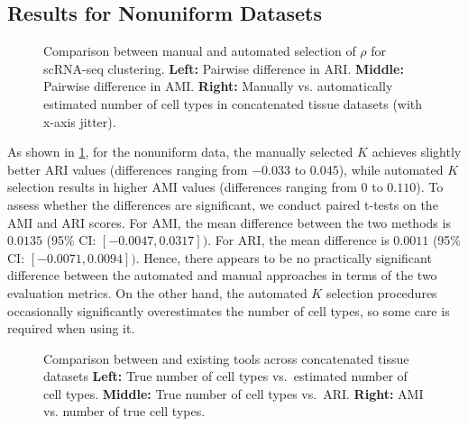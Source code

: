 \subsection{Results for Nonuniform Datasets}
\label{sec:non-unif-data}
\begin{figure}[tp]
	\centering



	\caption{Comparison between manual and automated selection of $\rho$ for scRNA-seq clustering. 
        \textbf{Left:} Pairwise difference in ARI. 
		\textbf{Middle:} Pairwise difference in AMI.
		\textbf{Right:}
        Manually vs. automatically estimated number of cell types in concatenated tissue datasets (with x-axis jitter).} 
	\label{fig:auto_comp}
\end{figure}
As shown in \cref{fig:auto_comp}, for the \textsf{nonuniform} data, 
the manually selected $K$ achieves slightly better ARI values (differences ranging from $-0.033$ to $0.045$), 
while automated $K$ selection results in higher AMI values (differences ranging from $0$ to $0.110$). 
To assess whether the differences are significant, we conduct paired t-tests on the AMI and ARI scores. For AMI, the mean
difference between the two methods is $0.0135$  (95\% CI: $[-0.0047, 0.0317])$. 
For ARI, the mean difference is $0.0011$ (95\% CI: $[-0.0071, 0.0094])$.
Hence, there appears to be no practically significant difference between the automated and manual approaches in terms of the two evaluation metrics.
On the other hand, the automated $K$ selection procedures occasionally significantly overestimates the number of cell types, so some care 
is required when using it. 
% 
\begin{figure}[tp]
	\centering
	\caption{Comparison between \methodname and existing tools across concatenated tissue datasets
    \textbf{Left:} True number of cell types vs.\ estimated number of cell types.
	\textbf{Middle:}  True number of cell types vs.\ ARI.
	\textbf{Right:} AMI vs. number of true cell types.
    }
	\label{fig:tool_comp_nonunif}
\end{figure}


